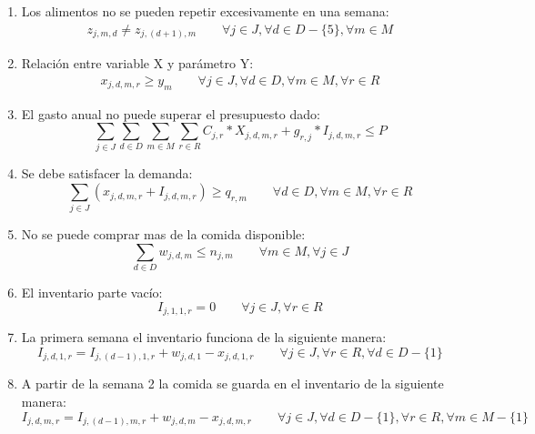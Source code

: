 \documentclass[letterpaper]{article}
\begin{document}
\begin{enumerate}
    \item Los alimentos no se pueden repetir excesivamente en una semana: 
        \begin{align*}
            z_{j,m,d} \neq z_{j,(d+1),m} \qquad \forall j \in J, \forall d \in D - \{5\}, \forall m \in M
        \end{align*}    
    \item Relación entre variable X y parámetro Y: 
        \begin{align*}
            x_{j,d,m,r} \geq y_m \qquad \forall j \in J, \forall d \in D, \forall m \in M, \forall r \in R
        \end{align*}           
    \item El gasto anual no puede superar el presupuesto dado: 
        \begin{equation*}
            \sum_{j \in J}\sum_{d \in D}\sum_{m \in M}\sum_{r \in R}{C_{j,r} * X_{j,d,m,r} + g_{r,j} * I_{j,d,m,r} } \leq P
        \end{equation*}
    \item Se debe satisfacer la demanda:
        \begin{equation*}
            \sum_{j \in J} (x_{j,d,m,r} + I_{j,d,m,r}) \geq q_{r,m} \qquad  \forall d \in D, \forall m \in M, \forall r \in R  
        \end{equation*}
    \item No se puede comprar mas de la comida disponible:
        \begin{equation*}
            \sum_{d \in D} w_{j,d,m} \leq n_{j,m} \qquad  \forall m \in M, \forall j \in J
        \end{equation*}
    \item El inventario parte vacío:
        \begin{equation*}
            I_{j,1,1,r} = 0 \qquad \forall j \in J, \forall r \in R
        \end{equation*}
    \item La primera semana el inventario funciona de la siguiente manera:
        \begin{equation*}
            I_{j,d,1,r} = I_{j,(d-1),1,r} + w_{j,d,1} - x_{j,d,1,r} \qquad \forall j \in J, \forall r \in R, \forall d \in D -\{1\}
        \end{equation*}
    \item A partir de la semana 2 la comida se guarda en el inventario de la siguiente manera:
        \begin{equation*}
            I_{j,d,m,r} = I_{j,(d-1),m,r} + w_{j,d,m} - x_{j,d,m,r} \qquad \forall j \in J, \forall d \in D -\{1\}, \forall r \in R, \forall m \in M - \{1\} 

\end{equation*}
\end{enumerate}
\end{document}
